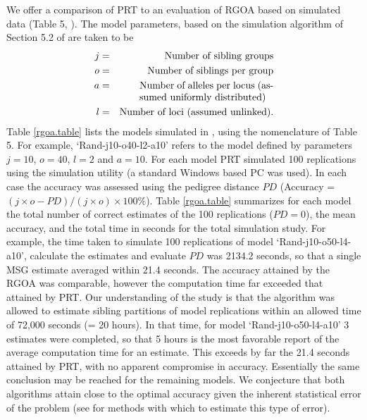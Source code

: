 \documentclass[twoside,10pt,twocolumn]{article}
\begin{document}
We offer a comparison of PRT to an evaluation of RGOA based on simulated data (Table 5, \cite{Chou2012}). 
The model parameters, based on the simulation algorithm of Section 5.2 of \cite{Chou2012}  are taken to be
\begin{eqnarray*}
j & = & \mbox{Number of sibling groups} \\
o & = & \mbox{Number of siblings per group} \\
a & = & \parbox[t]{.395\textwidth}{Number of alleles per locus (assumed uniformly distributed)}\\
l & = & \mbox{Number of loci (assumed unlinked)}. 
\end{eqnarray*}
Table \ref{rgoa.table} lists the models simulated in \citet{Chou2012}, using the nomenclature of Table 5. 
For example, `Rand-j10-o40-l2-a10' refers to the model defined by parameters $j = 10$, $o = 40$, $l = 2$ and 
$a = 10$. For each model PRT simulated 100 replications using the simulation utility \cite{alm&and11} (a 
standard Windows based PC was used). In each case the accuracy was assessed using the pedigree distance $PD$ 
(Accuracy = $(j\times o - PD)/(j \times o) \times 100\%$). Table \ref{rgoa.table} summarizes for each model 
the total number of correct estimates of the 100 replications ($PD = 0$), the mean accuracy, and the total 
time in seconds for the total simulation study. For example, the time taken to simulate 100 replications of 
model `Rand-j10-o50-l4-a10', calculate the estimates and evaluate $PD$ was 2134.2 seconds, so that a single 
MSG estimate averaged within 21.4 seconds. The accuracy attained by the RGOA was comparable, however the 
computation time far exceeded that attained by PRT. Our understanding of the study is that the algorithm was 
allowed to estimate sibling partitions of model replications within an allowed time of 72,000 seconds (= 20 
hours). In that time, for model `Rand-j10-o50-l4-a10' 3 estimates were completed, so that 5 hours is the 
most favorable report of the average computation time for an estimate. This exceeds by far the 21.4 seconds 
attained by PRT, with no apparent compromise in accuracy. Essentially the same conclusion may be reached for 
the remaining models. We conjecture that both algorithms attain close to the optimal accuracy given the 
inherent statistical error of the problem (see \cite{almudevar99} for methods with which to estimate this 
type of error).        
\end{document}
